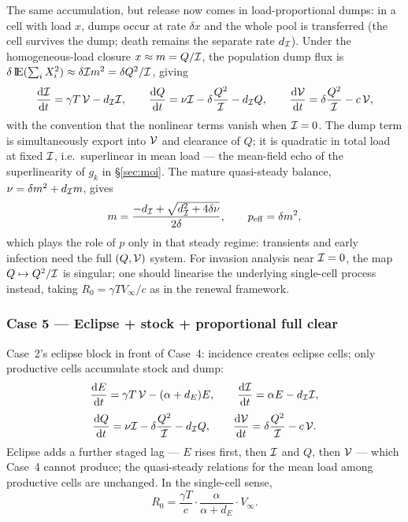 The same accumulation, but release now comes in load-proportional dumps: in
a cell with load $x$, dumps occur at rate $\delta x$ and the whole pool is
transferred (the cell survives the dump; death remains the separate rate
$d_{\mathcal{I}}$). Under the homogeneous-load closure $x\approx m=Q/\mathcal{I}$,
the population dump flux is $\delta\,{\rm I}\!{\rm E}(\sum_i X_i^2)\approx
\delta\mathcal{I} m^2=\delta Q^2/\mathcal{I}$, giving
\begin{equation}
\displaystyle\frac{{\rm d} \mathcal{I}}{{\rm d} t}=\gamma T\,\mathcal{V}-d_{\mathcal{I}}\mathcal{I},
\qquad
\displaystyle\frac{{\rm d} Q}{{\rm d} t}=\nu\mathcal{I}-\delta\frac{Q^2}{\mathcal{I}}-d_{\mathcal{I}}Q,
\qquad
\displaystyle\frac{{\rm d} \mathcal{V}}{{\rm d} t}=\delta\frac{Q^2}{\mathcal{I}}-c\,\mathcal{V},
\end{equation}
with the convention that the nonlinear terms vanish when $\mathcal{I}=0$. The
dump term is simultaneously export into $\mathcal{V}$ and clearance of $Q$; it
is quadratic in total load at fixed $\mathcal{I}$, i.e.\ superlinear in mean
load --- the mean-field echo of the superlinearity of $g_k$ in
\S\ref{sec:moi}. The mature quasi-steady balance,
$\nu=\delta m^2+d_{\mathcal{I}}m$, gives
\begin{equation}
m=\frac{-d_{\mathcal{I}}+\sqrt{d_{\mathcal{I}}^2+4\delta\nu}}{2\delta},
\qquad
p_{\mathrm{eff}}=\delta m^2,
\end{equation}
which plays the role of $p$ only in that steady regime: transients and
early infection need the full $(Q,\mathcal{V})$ system. For invasion analysis
near $\mathcal{I}=0$, the map $Q\mapsto Q^2/\mathcal{I}$ is singular; one should
linearise the underlying single-cell process instead, taking
$R_0=\gamma T V_\infty/c$ as in the renewal framework.

\subsubsection{Case 5 --- Eclipse + stock + proportional full clear}

Case~2's eclipse block in front of Case~4: incidence creates eclipse cells;
only productive cells accumulate stock and dump:
\begin{equation}
\displaystyle\frac{{\rm d} E}{{\rm d} t}=\gamma T\,\mathcal{V}-(\alpha+d_E)E,
\qquad
\displaystyle\frac{{\rm d} \mathcal{I}}{{\rm d} t}=\alpha E-d_{\mathcal{I}}\mathcal{I},
\end{equation}
\begin{equation}
\displaystyle\frac{{\rm d} Q}{{\rm d} t}=\nu\mathcal{I}-\delta\frac{Q^2}{\mathcal{I}}-d_{\mathcal{I}}Q,
\qquad
\displaystyle\frac{{\rm d} \mathcal{V}}{{\rm d} t}=\delta\frac{Q^2}{\mathcal{I}}-c\,\mathcal{V}.
\end{equation}
Eclipse adds a further staged lag --- $E$ rises first, then $\mathcal{I}$ and
$Q$, then $\mathcal{V}$ --- which Case~4 cannot produce; the quasi-steady
relations for the mean load among productive cells are unchanged. In the
single-cell sense,
\begin{equation}
R_0=\frac{\gamma T}{c}\cdot\frac{\alpha}{\alpha+d_E}\cdot V_\infty.
\end{equation}

